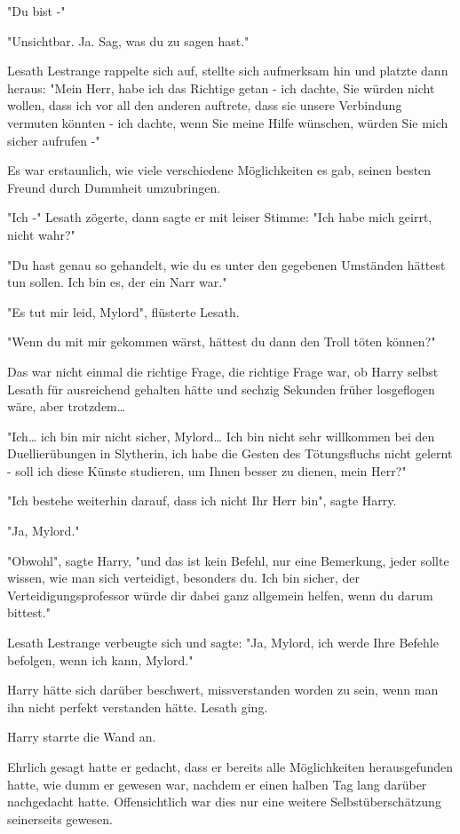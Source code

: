 {"Du bist -"

"Unsichtbar. Ja. Sag, was du zu sagen hast."

Lesath Lestrange rappelte sich auf, stellte sich aufmerksam hin und platzte dann heraus: "Mein Herr, habe ich das Richtige getan - ich dachte, Sie würden nicht wollen, dass ich vor all den anderen auftrete, dass sie unsere Verbindung vermuten könnten - ich dachte, wenn Sie meine Hilfe wünschen, würden Sie mich sicher aufrufen -"

Es war erstaunlich, wie viele verschiedene Möglichkeiten es gab, seinen besten Freund durch Dummheit umzubringen.

"Ich -" Lesath zögerte, dann sagte er mit leiser Stimme: "Ich habe mich geirrt, nicht wahr?"

"Du hast genau so gehandelt, wie du es unter den gegebenen Umständen hättest tun sollen. Ich bin es, der ein Narr war."

"Es tut mir leid, Mylord", flüsterte Lesath.

"Wenn du mit mir gekommen wärst, hättest du dann den Troll töten können?"

Das war nicht einmal die richtige Frage, die richtige Frage war, ob Harry selbst Lesath für ausreichend gehalten hätte und sechzig Sekunden früher losgeflogen wäre, aber trotzdem…

"Ich… ich bin mir nicht sicher, Mylord… Ich bin nicht sehr willkommen bei den Duellierübungen in Slytherin, ich habe die Gesten des Tötungsfluchs nicht gelernt - soll ich diese Künste studieren, um Ihnen besser zu dienen, mein Herr?"

"Ich bestehe weiterhin darauf, dass ich nicht Ihr Herr bin", sagte Harry.

"Ja, Mylord."

"Obwohl", sagte Harry, "und das ist kein Befehl, nur eine Bemerkung, jeder sollte wissen, wie man sich verteidigt, besonders du. Ich bin sicher, der Verteidigungsprofessor würde dir dabei ganz allgemein helfen, wenn du darum bittest."

Lesath Lestrange verbeugte sich und sagte: "Ja, Mylord, ich werde Ihre Befehle befolgen, wenn ich kann, Mylord."

Harry hätte sich darüber beschwert, missverstanden worden zu sein, wenn man ihn nicht perfekt verstanden hätte. Lesath ging.

Harry starrte die Wand an.

Ehrlich gesagt hatte er gedacht, dass er bereits alle Möglichkeiten herausgefunden hatte, wie dumm er gewesen war, nachdem er einen halben Tag lang darüber nachgedacht hatte. Offensichtlich war dies nur eine weitere Selbstüberschätzung seinerseits gewesen.

}
